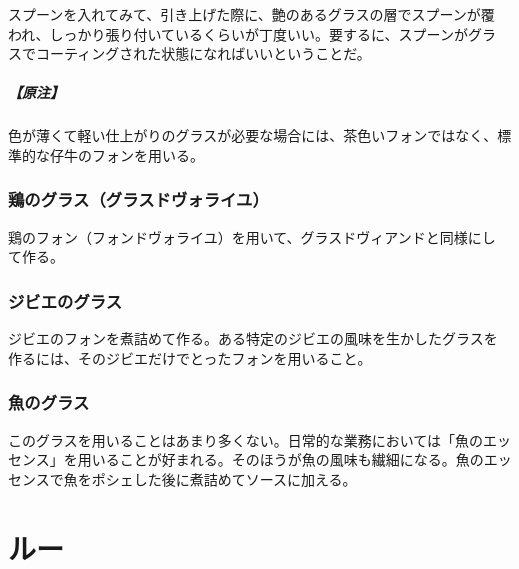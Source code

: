 \begin{recette}
スプーンを入れてみて、引き上げた際に、艶のあるグラスの層でスプーンが覆
われ、しっかり張り付いているくらいが丁度いい。要するに、スプーンがグラ
スでコーティングされた状態になればいいということだ。

\hypertarget{nota-glace-de-viande}{%
\subparagraph{【原注】}\label{nota-glace-de-viande}}

色が薄くて軽い仕上がりのグラスが必要な場合には、茶色いフォンではなく、標
準的な仔牛のフォンを用いる。

\hypertarget{glace-de-volaille}{%
\subsubsection{鶏のグラス（グラスドヴォライユ）}\label{glace-de-volaille}}



鶏のフォン（フォンドヴォライユ）を用いて、グラスドヴィアンドと同様にし
て作る。

\hypertarget{glace-de-gibier}{%
\subsubsection{ジビエのグラス}\label{glace-de-gibier}}



ジビエのフォンを煮詰めて作る。ある特定のジビエの風味を生かしたグラスを
作るには、そのジビエだけでとったフォンを用いること。

\hypertarget{glace-de-poisson}{%
\subsubsection{魚のグラス}\label{glace-de-poisson}}



このグラスを用いることはあまり多くない。日常的な業務においては「魚のエッ
センス」を用いることが好まれる。そのほうが魚の風味も繊細になる。魚のエッ
センスで魚をポシェした後に煮詰めてソースに加える。
\end{recette}
\hypertarget{roux}{%
\section{ルー}\label{roux}}

